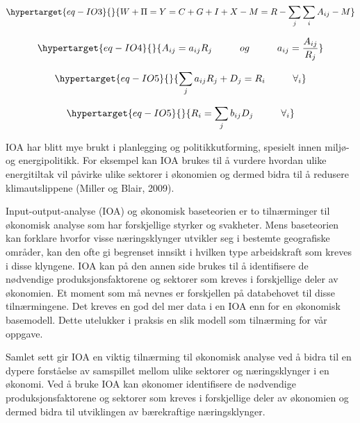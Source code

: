 \documentclass[
]{article}
\begin{document}
\begin{equation}\protect\hypertarget{eq-IO3}{}{
W + \Pi = Y = C + G + I + X - M = R - \sum_j \sum_i A_{ij} - M
}\label{eq-IO3}\end{equation}

\begin{equation}\protect\hypertarget{eq-IO4}{}{
A_{ij} = a_{ij}R_j \hspace{1cm} og \hspace{1cm} a_{ij} = \frac{A_{ij}}{R_j}
}\label{eq-IO4}\end{equation}

\begin{equation}\protect\hypertarget{eq-IO5}{}{
\sum_{j} a_{ij}R_j + D_j = R_i \hspace{1cm} \forall_{i}
}\label{eq-IO5}\end{equation}

\begin{equation}\protect\hypertarget{eq-IO5}{}{
R_i = \sum_{j} b_{ij}D_j \hspace{1cm} \forall_{i}
}\label{eq-IO5}\end{equation}

IOA har blitt mye brukt i planlegging og politikkutforming, spesielt
innen miljø- og energipolitikk. For eksempel kan IOA brukes til å
vurdere hvordan ulike energitiltak vil påvirke ulike sektorer i
økonomien og dermed bidra til å redusere klimautslippene (Miller og
Blair, 2009).

Input-output-analyse (IOA) og økonomisk baseteorien er to tilnærminger
til økonomisk analyse som har forskjellige styrker og svakheter. Mens
baseteorien kan forklare hvorfor visse næringsklynger utvikler seg i
bestemte geografiske områder, kan den ofte gi begrenset innsikt i
hvilken type arbeidskraft som kreves i disse klyngene. IOA kan på den
annen side brukes til å identifisere de nødvendige produksjonsfaktorene
og sektorer som kreves i forskjellige deler av økonomien. Et moment som
må nevnes er forskjellen på databehovet til disse tilnærmingene. Det
kreves en god del mer data i en IOA enn for en økonomisk basemodell.
Dette utelukker i praksis en slik modell som tilnærming for vår oppgave.

Samlet sett gir IOA en viktig tilnærming til økonomisk analyse ved å
bidra til en dypere forståelse av samspillet mellom ulike sektorer og
næringsklynger i en økonomi. Ved å bruke IOA kan økonomer identifisere
de nødvendige produksjonsfaktorene og sektorer som kreves i forskjellige
deler av økonomien og dermed bidra til utviklingen av bærekraftige
næringsklynger.
\end{document}
